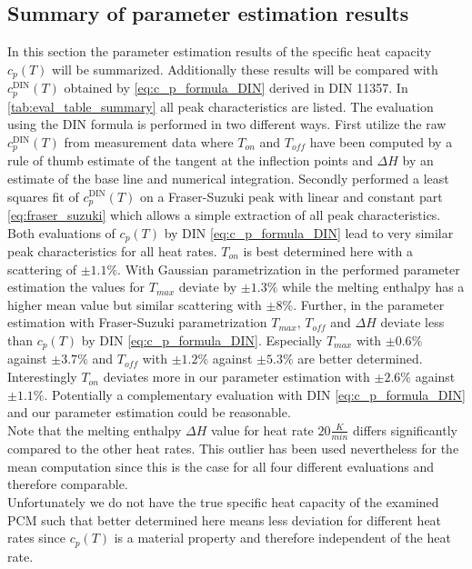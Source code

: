 \documentclass{scrartcl}[12pt, halfparskip]
\numberwithin{equation}{section}
\numberwithin{figure}{section}
\numberwithin{table}{section}
\begin{document}
\subsection{Summary of parameter estimation results}

In this section the parameter estimation results of the specific heat capacity $c_p(T)$ will be summarized. Additionally these results will be compared with $c_p^{\text{DIN}}(T)$ obtained by \cref{eq:c_p_formula_DIN} derived in DIN 11357. In \cref{tab:eval_table_summary} all peak characteristics are listed. The evaluation using the DIN formula is performed in two different ways. First utilize the raw $c_p^{\text{DIN}}(T)$ from measurement data where $T_{on}$ and $T_{off}$ have been computed by a rule of thumb estimate of the tangent at the inflection points and $\Delta H$ by an estimate of the base line and numerical integration. Secondly performed a least squares fit of $c_p^{\text{DIN}}(T)$ on a Fraser-Suzuki peak with linear and constant part \cref{eq:fraser_suzuki} which allows a simple extraction of all peak characteristics. \\
Both evaluations of $c_p(T)$ by DIN \cref{eq:c_p_formula_DIN} lead to very similar peak characteristics for all heat rates. $T_{on}$ is best determined here with a scattering of $\pm 1.1\%$. With Gaussian parametrization in the performed parameter estimation the values for $T_{max}$ deviate by $\pm 1.3\%$ while the melting enthalpy has a higher mean value but similar scattering with $\pm 8\%$. Further, in the parameter estimation with Fraser-Suzuki parametrization $T_{max}$, $T_{off}$ and $\Delta H$ deviate less than $c_p(T)$ by DIN \cref{eq:c_p_formula_DIN}. Especially $T_{max}$ with $\pm 0.6\%$ against $\pm 3.7\%$ and $T_{off}$ with $\pm 1.2\%$ against $\pm 5.3 \%$ are better determined. Interestingly $T_{on}$ deviates more in our parameter estimation with $\pm 2.6\%$ against $\pm 1.1\%$. Potentially a complementary evaluation with DIN \cref{eq:c_p_formula_DIN} and our parameter estimation could be reasonable. \\
Note that the melting enthalpy $\Delta H$ value for heat rate $20 \frac{K}{min}$ differs significantly compared to the other heat rates. This outlier has been used nevertheless for the mean computation since this is the case for all four different evaluations and therefore comparable. \\
Unfortunately we do not have the true specific heat capacity of the examined PCM such that better determined here means less deviation for different heat rates since $c_p(T)$ is a material property and therefore independent of the heat rate.
\end{document}
